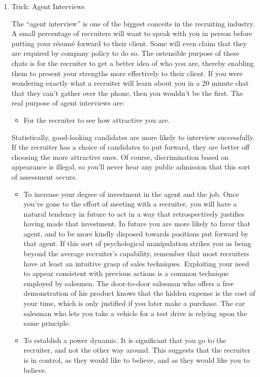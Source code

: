 \documentclass{article}
\begin{document}
\begin{enumerate}
\begin{enumerate}
\item Trick: Agent Interviews
\label{sec:orgheadline120}

The “agent interview” is one of the biggest conceits in the recruiting
industry. A small percentage of recruiters will want to speak with you
in person before putting your résumé forward to their client. Some will
even claim that they are required by company policy to do so. The
ostensible purpose of these chats is for the recruiter to get a better
idea of who you are, thereby enabling them to present your strengths
more effectively to their client. If you were wondering exactly what a
recruiter will learn about you in a 20 minute chat that they can't
gather over the phone, then you wouldn't be the first. The real purpose
of agent interviews are:

\begin{itemize}
\item For the recruiter to see how attractive you are.
\end{itemize}

Statistically, good-looking candidates are more likely to interview
successfully. If the recruiter has a choice of candidates to put
forward, they are better off choosing the more attractive ones. Of
course, discrimination based on appearance is illegal, so you'll never
hear any public admission that this sort of assessment occurs.

\begin{itemize}
\item To increase your degree of investment in the agent and the job. Once
you've gone to the effort of meeting with a recruiter, you will have
a natural tendency in future to act in a way that retrospectively
justifies having made that investment. In future you are more likely
to favor that agent, and to be more kindly disposed towards positions
put forward by that agent. If this sort of psychological manipulation
strikes you as being beyond the average recruiter's capability,
remember that most recruiters have at least an intuitive grasp of
sales techniques. Exploiting your need to appear consistent with
previous actions is a common technique employed by salesmen. The
door-to-door salesman who offers a free demonstration of his product
knows that the hidden expense is the cost of your time, which is only
justified if you later make a purchase. The car salesman who lets you
take a vehicle for a test drive is relying upon the same principle.
\item To establish a power dynamic. It is significant that you go to the
recruiter, and not the other way around. This suggests that the
recruiter is in control, as they would like to believe, and as they
would like you to believe.
\end{itemize}


\end{enumerate}
\end{enumerate}
\end{document}
